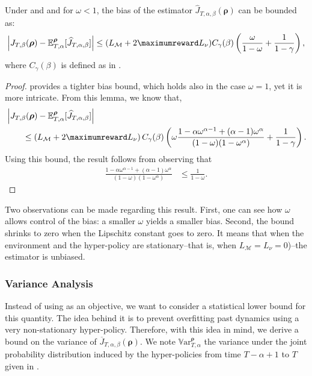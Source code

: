 \begin{lemma}
\label{lem:bias_bound}
Under  and  and for $\omega<1$, the bias of the estimator $\widehat{J}_{T,\alpha,\beta}(\boldsymbol\rho)$ can be bounded as:
\begin{align*}
    \left\vert J_{T,\beta}(\boldsymbol\rho) - \mathbb{E}^{\boldsymbol\rho}_{T,\alpha}[\widehat{J}_{T,\alpha,\beta}] \right\vert  
    \le (L_{\mathcal{M}} + 2\maximumreward L_\nu)  C_\gamma(\beta)\left(\frac{\omega}{1-\omega} +\frac{1}{1-\gamma}\right),
\end{align*}
where $C_\gamma(\beta)$ is defined as in .
\end{lemma}
\begin{proof}
     provides a tighter bias bound, which holds also in the case $\omega=1$, yet it is more intricate.
    From this lemma, we know that,
    \begin{align*}
        &\left\vert J_{T,\beta}(\boldsymbol\rho) - \mathbb{E}^{\boldsymbol\rho}_{T,\alpha}[\widehat{J}_{T,\alpha,\beta}] \right\vert
        \\
        &\qquad \le\left(L_{\mathcal{M}} + 2\maximumreward L_\nu\right) C_{\gamma}(\beta) \left(\omega 
        \frac{1-\alpha\omega^{\alpha-1} + (\alpha-1) \omega^\alpha}{(1-\omega)(1-\omega^\alpha)} + \frac{1}{1-\gamma}\right).
    \end{align*}
    Using this bound, the result follows from observing that  
    \begin{align*}
        \frac{1-\alpha\omega^{\alpha-1} + (\alpha-1) \omega^\alpha}{(1-\omega)(1-\omega^\alpha)} 
        & \leq \frac{1}{1-\omega} .
    \end{align*}  
\end{proof}

Two observations can be made regarding this result. 
First, one can see how $\omega$ allows control of the bias: a smaller $\omega$ yields a smaller bias. 
Second, the bound shrinks to zero when the Lipschitz constant goes to zero. 
It means that when the environment and the hyper-policy are stationary--that is, when $L_{\mathcal{M}}=L_{\nu}=0$)--the estimator is unbiased.


\subsubsection{Variance Analysis}
\label{subsec:variance_analysis}
Instead of using  as an objective, we want to consider a statistical lower bound for this quantity. 
The idea behind it is to prevent overfitting past dynamics using a very non-stationary hyper-policy. 
Therefore, with this idea in mind, we derive a bound on the variance of $\overline{J}_{T,\alpha,\beta}(\boldsymbol\rho)$.
We note $\mathbb{V}\mathrm{ar}^{\boldsymbol\rho}_{T,\alpha}$ the variance under the joint probability distribution induced by the hyper-policies from time $T-\alpha+1$ to $T$ given in .

